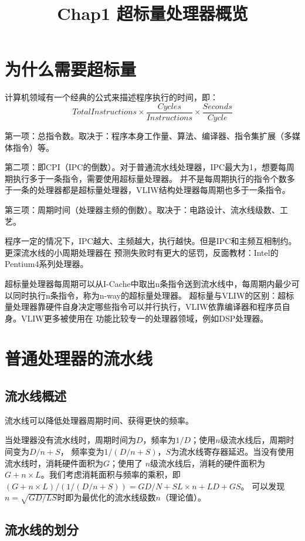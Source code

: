 \documentclass{article}
\title{Chap1 超标量处理器概览}
\author{}
\date{}
\begin{document}
  \maketitle
  \section{为什么需要超标量}
  计算机领域有一个经典的公式来描述程序执行的时间，即：
  $${Total Instructions} \times \frac{Cycles}{{Instructions}} \times \frac{{Seconds}}{{Cycle}}$$
  
  第一项：总指令数。取决于：程序本身工作量、算法、编译器、指令集扩展（多媒体指令）等。

  第二项：即CPI（IPC的倒数）。对于普通流水线处理器，IPC最大为1，想要每周期执行多于一条指令，需要使用超标量处理器。
  并不是每周期执行的指令个数多于一条的处理器都是超标量处理器，VLIW结构处理器每周期也多于一条指令。

  第三项：周期时间（处理器主频的倒数）。取决于：电路设计、流水线级数、工艺。

  程序一定的情况下，IPC越大、主频越大，执行越快。但是IPC和主频互相制约。更深流水线的小周期处理器在
  预测失败时有更大的惩罚，反面教材：Intel的Pentium4系列处理器。
  
  超标量处理器每周期可以从I-Cache中取出n条指令送到流水线中，每周期内最少可以同时执行n条指令，称为n-way的超标量处理器。
  超标量与VLIW的区别：超标量处理器靠硬件自身决定哪些指令可以并行执行，VLIW依靠编译器和程序员自身。VLIW更多被使用在
  功能比较专一的处理器领域，例如DSP处理器。

  \section{普通处理器的流水线}
  \subsection{流水线概述}
  流水线可以降低处理器周期时间、获得更快的频率。

  当处理器没有流水线时，周期时间为$D$，频率为$1/D$；使用$n$级流水线后，周期时间变为$D/n+S$，
  频率变为$1/(D/n+S)$，$S$为流水线寄存器延迟。当没有使用流水线时，消耗硬件面积为$G$；使用了
  $n$级流水线后，消耗的硬件面积为$G+n\times L$。我们考虑消耗面积与频率的乘积，即$(G+n\times L)/(1/(D/n+S))=GD/N+SL\times n+LD+GS$。
  可以发现$n=\sqrt{GD/LS}$时即为最优化的流水线级数$n$（理论值）。

  \subsection{流水线的划分}
\end{document}
